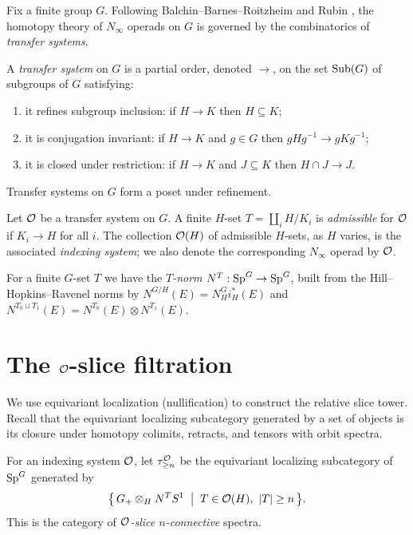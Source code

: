 \documentclass[11pt]{article}
\begin{document}
Fix a finite group $G$. Following Balchin--Barnes--Roitzheim \cite{BBR} and
Rubin \cite{Rubin}, the homotopy theory of $N_\infty$ operads on $G$ is governed
by the combinatorics of \emph{transfer systems}.

\begin{qfivedefinition}
A \emph{transfer system} on $G$ is a partial order, denoted $\to$, on the set
$\operatorname{Sub}(G)$ of subgroups of $G$ satisfying:
\begin{enumerate}\setlength\itemsep{2pt}
\item it refines subgroup inclusion: if $H\to K$ then $H\subseteq K$;
\item it is conjugation invariant: if $H\to K$ and $g\in G$ then
$gHg^{-1}\to gKg^{-1}$;
\item it is closed under restriction: if $H\to K$ and $J\subseteq K$ then
$H\cap J\to J$.
\end{enumerate}
Transfer systems on $G$ form a poset under refinement.
\end{qfivedefinition}

\begin{qfivedefinition}
Let $\mathcal{O}$ be a transfer system on $G$. A finite $H$-set $T=\coprod_i H/K_i$ is
\emph{admissible} for $\mathcal{O}$ if $K_i\to H$ for all $i$. The collection $\mathcal{O}(H)$ of
admissible $H$-sets, as $H$ varies, is the associated \emph{indexing system}; we
also denote the corresponding $N_\infty$ operad by $\mathcal{O}$.
\end{qfivedefinition}

For a finite $G$-set $T$ we have the \emph{$T$-norm}
$N^T:\mathrm{Sp}^G\to\mathrm{Sp}^G$, built from the Hill--Hopkins--Ravenel norms \cite{HHR16}
by $N^{G/H}(E)=N^G_H i_H^\ast(E)$ and $N^{T_0\sqcup T_1}(E)=N^{T_0}(E)\otimes
N^{T_1}(E)$.

\section*{The $\mathcal{O}$-slice filtration}

We use equivariant localization (nullification) to construct the relative slice
tower. Recall that the equivariant localizing subcategory generated by a set of
objects is its closure under homotopy colimits, retracts, and tensors with orbit
spectra.

\begin{qfivedefinition}
For an indexing system $\mathcal{O}$, let $\tau^{\mathcal{O}}_{\ge n}$ be the equivariant
localizing subcategory of $\mathrm{Sp}^G$ generated by
\[
\bigl\{\, G_+\otimes_H N^T S^1 \;\bigm|\; T\in\mathcal{O}(H),\ |T|\ge n \,\bigr\}.
\]
This is the category of \emph{$\mathcal{O}$-slice $n$-connective} spectra.
\end{qfivedefinition}
\end{document}
